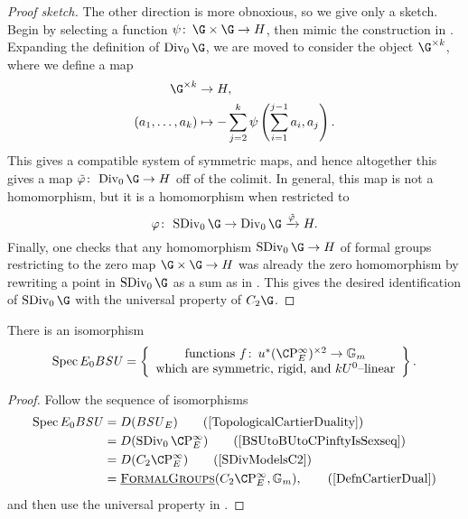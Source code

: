 \begin{proof}[Proof sketch]
The other direction is more obnoxious, so we give only a sketch.  Begin by selecting a function \(\psi\co \G \times \G \to H\), then mimic the construction in .  Expanding the definition of \(\Div_0 \G\), we are moved to consider the object \(\G^{\times k}\), where we define a map
\begin{align*}
\G^{\times k} & \to H, \\
(a_1, \ldots, a_k) & \mapsto -\sum_{j=2}^k \psi\left(\sum_{i=1}^{j-1} a_i, a_j \right).
\end{align*}
This gives a compatible system of symmetric maps, and hence altogether this gives a map \(\tilde\phi\co\Div_0 \G \to H\) off of the colimit.  In general, this map is not a homomorphism, but it is a homomorphism when restricted to \[\phi\co \SDiv_0 \G \to \Div_0 \G \xrightarrow{\tilde\phi} H.\]  Finally, one checks that any homomorphism \(\SDiv_0 \G \to H\) of formal groups restricting to the zero map \(\G \times \G \to H\) was already the zero homomorphism by rewriting a point in \(\SDiv_0 \G\) as a sum as in .  This gives the desired identification of \(\SDiv_0 \G\) with the universal property of \(C_2 \G\).
\end{proof}

\begin{corollary}\label{CharacterizationOfBSUUpperE}
There is an isomorphism \[\Spec E_0 B\SU = \left\{\begin{array}{c} \text{functions \(f\co u^* (\CP^\infty_E)^{\times 2} \to \Gm\)} \\ \text{which are symmetric, rigid, and \(kU^0\)--linear} \end{array}\right\}.\]
\end{corollary}
\begin{proof}
Follow the sequence of isomorphisms
\begin{align*}
\Spec E_0 B\SU & = D(B\SU_E) \tag{\Cref{TopologicalCartierDuality}} \\
& = D(\SDiv_0 \CP^\infty_E) \tag{\Cref{BSUtoBUtoCPinftyIsSexseq}} \\
& = D(C_2 \CP^\infty_E) \tag{\Cref{SDivModelsC2}} \\
& = \InternalHom{FormalGroups}(C_2 \CP^\infty_E, \Gm), \tag{\Cref{DefnCartierDual}}
\end{align*}
and then use the universal property in .
\end{proof}

